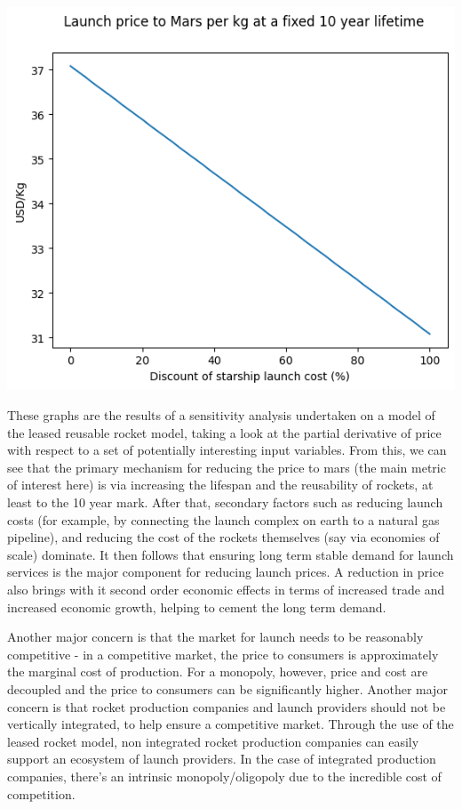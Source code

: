 \documentclass[10pt]{article}
\begin{document}
\includegraphics{fig_disclaunchflights.png}

These graphs are the results of a sensitivity analysis undertaken on a model of the leased reusable rocket model, taking a look at the partial derivative of price with respect to a set of potentially interesting input variables. From this, we can see that the primary mechanism for reducing the price to mars (the main metric of interest here) is via increasing the lifespan and the reusability of rockets, at least to the 10 year mark. After that, secondary factors such as reducing launch costs (for example, by connecting the launch complex on earth to a natural gas pipeline), and reducing the cost of the rockets themselves (say via economies of scale) dominate. It then follows that ensuring long term stable demand for launch services is the major component for reducing launch prices. A reduction in price also brings with it second order economic effects in terms of increased trade and increased economic growth, helping to cement the long term demand.

Another major concern is that the market for launch needs to be reasonably competitive - in a competitive market, the price to consumers is approximately the marginal cost of production. For a monopoly, however, price and cost are decoupled and the price to consumers can be significantly higher. Another major concern is that rocket production companies and launch providers should not be vertically integrated, to help ensure a competitive market. Through the use of the leased rocket model, non integrated rocket production companies can easily support an ecosystem of launch providers. In the case of integrated production companies, there's an intrinsic monopoly/oligopoly due to the incredible cost of competition.
\end{document}
